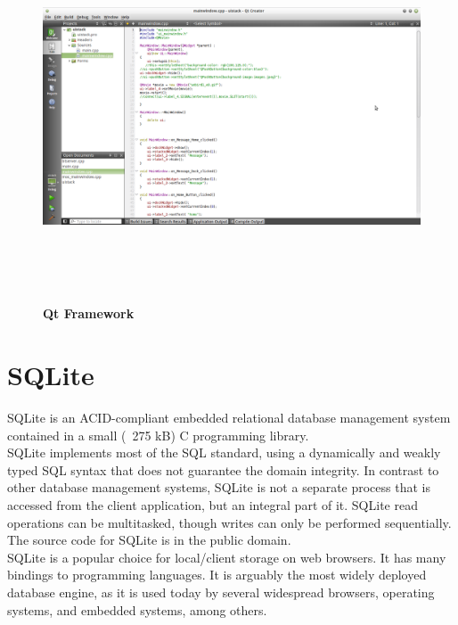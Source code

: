 \begin{figure}[H]
  \centering
    \includegraphics[height= 11cm, width=17cm]{project/images/qt}
  \caption{\textbf{Qt Framework}}
\end{figure}

\section{SQLite}
\hspace*{0.82cm}SQLite is an ACID-compliant embedded relational database management system contained in a small (~275 kB) C 
programming library.\\[0.5cm]
\hspace*{0.82cm}SQLite implements most of the SQL standard, using a dynamically and weakly typed SQL syntax that does not 
guarantee the domain integrity. In contrast to other database management systems, SQLite is not a separate process that is accessed 
from the client application, but an integral part of it. SQLite read operations can be multitasked, though writes can only be 
performed sequentially. The source code for SQLite is in the public domain.\\[0.5cm]
\hspace*{0.82cm}SQLite is a popular choice for local/client storage on web browsers. It has many bindings to programming 
languages. It is arguably the most widely deployed database engine, as it is used today by several widespread browsers, operating 
systems, and embedded systems, among others.

